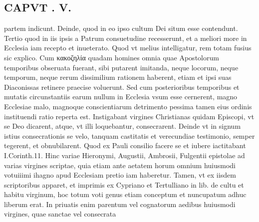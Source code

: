 \documentclass{article}
\begin{document}
\begin{pages}
\section*{CAPVT . V. }
\marginpar{[ p.291 ]}\pstart partem indicunt. Deinde, quod in eo ipso cultum Dei situm esse contendunt. Tertio quod in iis ipsis a Patrum consuetudine recesserunt, et a meliori more in Ecclesia iam recepto et inueterato. Quod vt melius intelligatur, rem totam fusius sic explico. Cum κακοζηλία quadam homines omnia quae Apostolorum temporibus obseruata fuerant, sibi putarent imitanda, neque locorum, neque temporum, neque rerum dissimilium rationem haberent, etiam et ipsi suas Diaconissas retinere praecise voluerunt. Sed cum posterioribus temporibus et mutatis circunstantiis earum nullum in Ecclesia vsum esse cernerent, magno Ecclesiae malo, magnoque conscientiarum detrimento pessima tamen eius ordinis instituendi ratio reperta est. Instigabant virgines Christianas quidam Episcopi, vt se Deo dicarent, atque, vt illi loquebantur, consecrarent. Deinde vt in signum istius consecrationis se velo, tanquam castitatis et verecundiae testimonio, semper tegerent, et obnubilarent. Quod ex Pauli consilio facere se et iubere iactitabant I.Corinth.11. Hinc variae Hieronymi, Augustii, Ambrosii, Fulgentii epistolae ad varias virgines scriptae, quia etiam ante aetatem horum omnium huiusmodi votuiiimi ihagno apud Ecclesiam pretio iam haberetur. Tamen, vt ex iisdem scriptoribus apparet, et imprimis ex Cypriano et Tertulliano in lib.  de cultu et habitu virginum, hoc totum voti genus etiam conceptum et nuncupatum adhuc liberum erat. In priuatis enim parentum vel cognatorum aedibus huiusmodi virgines, quae sanctae vel consecrata  \pend

\end{pages}
\end{document}
